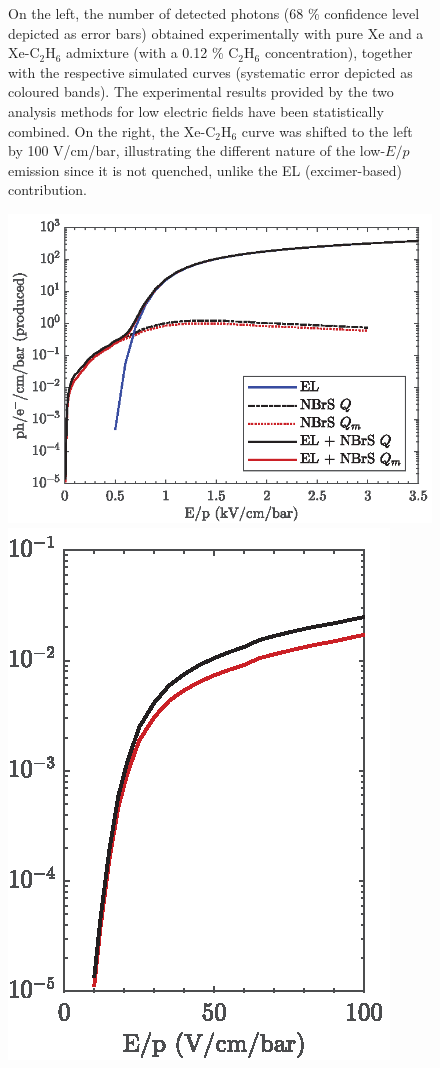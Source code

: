 \documentclass[%
 reprint,
superscriptaddress,
 amsmath,amssymb,
 aps,
]{revtex4-2}
\begin{document}
\begin{figure}[tbp]
\hfill
\caption{\label{fig:mix}On the left, the number of detected photons (68 \% confidence level depicted as error bars) obtained experimentally with pure Xe and a Xe-C$_{2}$H$_{6}$ admixture (with a 0.12 \% C$_{2}$H$_{6}$ concentration), together with the respective simulated curves (systematic error depicted as coloured bands). The experimental results provided by the two analysis methods for low electric fields have been statistically combined. On the right, the Xe-C$_{2}$H$_{6}$ curve was shifted to the left by 100 V/cm/bar, illustrating the different nature of the low-$E/p$ emission since it is not quenched, unlike the EL (excimer-based) contribution.}
\end{figure}

\begin{figure}[tbp]%
\centering %
\includegraphics[]{Fig13a.eps}
\includegraphics[]{Fig13b.eps}

\end{figure}
\end{document}

